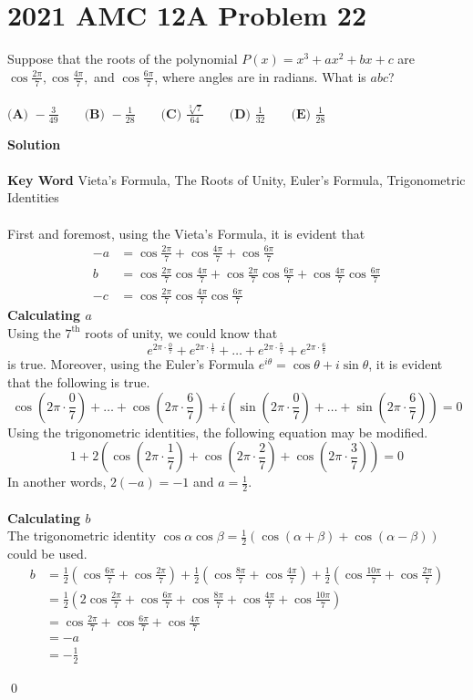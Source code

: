 \documentclass{article}
\newenvironment{solution}{\begin{trivlist}\item[]{\bf Solution}}{\qed \end{trivlist}}
\begin{document}
\section*{2021 AMC 12A Problem 22}
Suppose that the roots of the polynomial $P(x)=x^3+ax^2+bx+c$ are $\cos \frac{2\pi}7,\cos \frac{4\pi}7,$ and $\cos \frac{6\pi}7$, where angles are in radians. What is $abc$?
\\\\
$\textbf{(A) }{-}\frac{3}{49} \qquad \textbf{(B) }{-}\frac{1}{28} \qquad \textbf{(C) }\frac{\sqrt[3]7}{64} \qquad \textbf{(D) }\frac{1}{32}\qquad \textbf{(E) }\frac{1}{28}$
\begin{solution}
\\\\
\textbf{Key Word} Vieta's Formula, The Roots of Unity, Euler's Formula, Trigonometric Identities
\\\\
First and foremost, using the Vieta's Formula, it is evident that
\begin{align*}
-a&=\cos\frac{2\pi}{7}+\cos\frac{4\pi}{7}+\cos\frac{6\pi}{7} \\
b&=\cos\frac{2\pi}{7}\cos\frac{4\pi}{7}+\cos\frac{2\pi}{7}\cos\frac{6\pi}{7}+\cos\frac{4\pi}{7}\cos\frac{6\pi}{7} \\
-c&=\cos\frac{2\pi}{7}\cos\frac{4\pi}{7}\cos\frac{6\pi}{7}
\end{align*}
\textbf{Calculating $a$} \\
Using the $7^{\text{th}}$ roots of unity, we could know that
\[
e^{2\pi\cdot\frac{0}{7}}+e^{2\pi\cdot\frac{1}{7}}+\dots+e^{2\pi\cdot\frac{5}{7}}+e^{2\pi\cdot\frac{6}{7}}
\]
is true. Moreover, using the Euler's Formula $e^{i\theta}=\cos\theta+i\sin\theta$, it is evident that the following is true.
\[
\cos\left(2\pi\cdot\frac{0}{7}\right)+\dots+\cos\left(2\pi\cdot\frac{6}{7}\right)+i\left(\sin\left(2\pi\cdot\frac{0}{7}\right)+\dots+\sin\left(2\pi\cdot\frac{6}{7}\right)\right)=0
\]
Using the trigonometric identities, the following equation may be modified.
\[
1+2\left(\cos\left(2\pi\cdot\frac{1}{7}\right)+\cos\left(2\pi\cdot\frac{2}{7}\right)+\cos\left(2\pi\cdot\frac{3}{7}\right)\right)=0
\]
In another words, $2(-a)=-1$ and $a=\frac{1}{2}$.
\\\\
\textbf{Calculating $b$} \\
The trigonometric identity $\cos\alpha\cos\beta=\frac{1}{2}(\cos(\alpha+\beta)+\cos(\alpha-\beta))$ could be used.
\begin{align*}
    b&=\frac{1}{2}\left(\cos\frac{6\pi}{7}+\cos\frac{2\pi}{7}\right)+\frac{1}{2}\left(\cos\frac{8\pi}{7}+\cos\frac{4\pi}{7}\right)+\frac{1}{2}\left(\cos\frac{10\pi}{7}+\cos\frac{2\pi}{7}\right) \\
    &=\frac{1}{2}\left(2\cos\frac{2\pi}{7}+\cos\frac{6\pi}{7}+\cos\frac{8\pi}{7}+\cos\frac{4\pi}{7}+\cos\frac{10\pi}{7}\right) \\
    &=\cos\frac{2\pi}{7}+\cos\frac{6\pi}{7}+\cos\frac{4\pi}{7} \\
    &=-a \\
    &=-\frac{1}{2}
\end{align*}


\end{solution}
\end{document}
